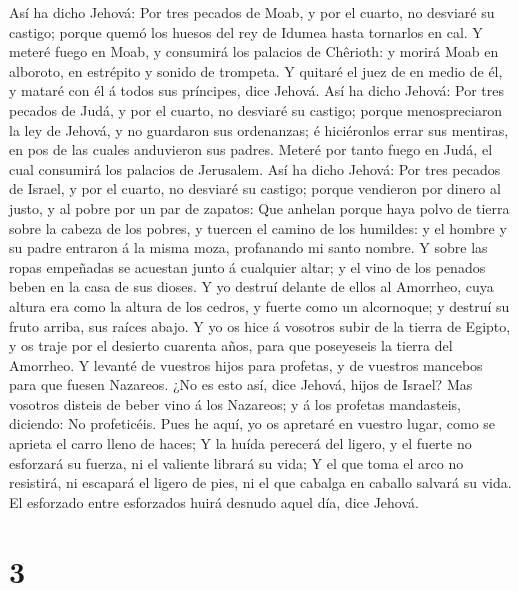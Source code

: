  Así ha dicho Jehová: Por tres pecados de Moab, y por el
cuarto, no desviaré su castigo; porque quemó los huesos del rey de
Idumea hasta tornarlos en cal.  Y meteré fuego en Moab, y
consumirá los palacios de Chêrioth: y morirá Moab en alboroto, en
estrépito y sonido de trompeta.  Y quitaré el juez de en
medio de él, y mataré con él á todos sus príncipes, dice Jehová.
 Así ha dicho Jehová: Por tres pecados de Judá, y por el
cuarto, no desviaré su castigo; porque menospreciaron la ley de Jehová,
y no guardaron sus ordenanzas; é hiciéronlos errar sus mentiras, en pos
de las cuales anduvieron sus padres.  Meteré por tanto fuego
en Judá, el cual consumirá los palacios de Jerusalem.  Así
ha dicho Jehová: Por tres pecados de Israel, y por el cuarto, no
desviaré su castigo; porque vendieron por dinero al justo, y al pobre
por un par de zapatos:  Que anhelan porque haya polvo de
tierra sobre la cabeza de los pobres, y tuercen el camino de los
humildes: y el hombre y su padre entraron á la misma moza, profanando mi
santo nombre.  Y sobre las ropas empeñadas se acuestan junto
á cualquier altar; y el vino de los penados beben en la casa de sus
dioses.  Y yo destruí delante de ellos al Amorrheo, cuya
altura era como la altura de los cedros, y fuerte como un alcornoque; y
destruí su fruto arriba, sus raíces abajo.  Y yo os hice á
vosotros subir de la tierra de Egipto, y os traje por el desierto
cuarenta años, para que poseyeseis la tierra del Amorrheo. 
Y levanté de vuestros hijos para profetas, y de vuestros mancebos para
que fuesen Nazareos. ¿No es esto así, dice Jehová, hijos de Israel?
 Mas vosotros disteis de beber vino á los Nazareos; y á los
profetas mandasteis, diciendo: No profeticéis.  Pues he
aquí, yo os apretaré en vuestro lugar, como se aprieta el carro lleno de
haces;  Y la huída perecerá del ligero, y el fuerte no
esforzará su fuerza, ni el valiente librará su vida;  Y el
que toma el arco no resistirá, ni escapará el ligero de pies, ni el que
cabalga en caballo salvará su vida.  El esforzado entre
esforzados huirá desnudo aquel día, dice Jehová.

\hypertarget{section-2}{%
\section{3}\label{section-2}}

